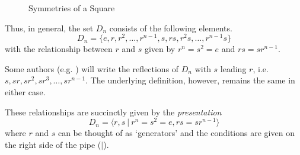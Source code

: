 \begin{figure}[h]
    \centering
    \caption{Symmetries of a Square}
\end{figure}

Thus, in general, the set $D_n$ consists of the following elements.
\[
    D_n = \{e, r, r^2, \dots, r^{n-1}, s, rs, r^2s, \dots, r^{n-1}s\}
\]
with the relationship between $r$ and $s$ given by $r^n = s^2 = e$ and $rs = sr^{n-1}$.

\begin{remark}
    Some authors (e.g. \cite{humphreys_1996}) will write the reflections of $D_n$ with $s$ leading $r$, i.e. $s, sr, sr^2, sr^3, \dots, sr^{n-1}$. The underlying definition, however, remains the same in either case.
\end{remark}

These relationships are succinctly given by the \textit{presentation}
\[
    D_n = \langle r, s \ | \ r^n = s^2 = e, rs = sr^{n-1} \rangle
\]
where $r$ and $s$ can be thought of as `generators' and the conditions are given on the right side of the pipe ($|$).

